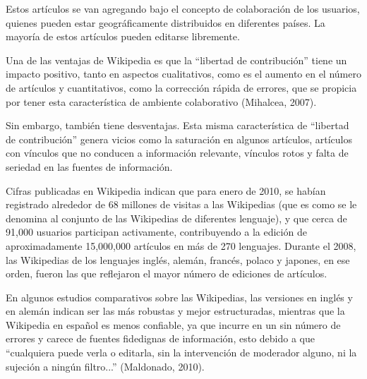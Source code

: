 \documentclass[letterpaper]{article}
\newcommand\textstylebibuscitbase[1]{#1}
\begin{document}
\bigskip

{\sffamily
Estos art\'iculos se van agregando bajo el concepto de colaboraci\'on de
los usuarios, quienes pueden estar geogr\'aficamente distribuidos en
diferentes pa\'ises. La mayor\'ia de estos art\'iculos pueden editarse
libremente.}


\bigskip

{\sffamily
Una de las ventajas de Wikipedia es que la {\textquotedblleft}libertad
de contribuci\'on{\textquotedblright} tiene un impacto positivo, tanto
en aspectos cualitativos, como es el aumento en el n\'umero de
art\'iculos y cuantitativos, como la correcci\'on r\'apida de errores,
que se propicia por tener esta caracter\'istica de ambiente
colaborativo \textstylebibuscitbase{(Mihalcea, 2007)}.}


\bigskip

{\sffamily
Sin embargo, tambi\'en tiene desventajas. Esta misma caracter\'istica de
{\textquotedblleft}libertad de contribuci\'on{\textquotedblright}
genera vicios como la saturaci\'on en algunos art\'iculos, art\'iculos
con v\'inculos que no conducen a informaci\'on relevante, v\'inculos
rotos y falta de seriedad en las fuentes de informaci\'on.}


\bigskip

{\sffamily
Cifras publicadas en Wikipedia indican que para enero de 2010, se
hab\'ian registrado alrededor de 68 millones de visitas a las
Wikipedias (que es como se le denomina al conjunto de las Wikipedias de
diferentes lenguaje), y que cerca de 91,000 usuarios participan
activamente, contribuyendo a la edici\'on de aproximadamente 15,000,000
art\'iculos en m\'as de 270 lenguajes. Durante el 2008, las Wikipedias
de los lenguajes ingl\'es, alem\'an, franc\'es, polaco y japones, en
ese orden, fueron las que reflejaron el mayor n\'umero de ediciones de
art\'iculos.}


\bigskip

{\sffamily
En algunos estudios comparativos sobre las Wikipedias, las versiones en
ingl\'es y en alem\'an indican ser las m\'as robustas y mejor
estructuradas, mientras que la Wikipedia en espa\~nol es menos
confiable, ya que incurre en un sin n\'umero de errores y carece de
fuentes fidedignas de informaci\'on, esto debido a que
{\textquotedblleft}cualquiera puede verla o editarla, sin la
intervenci\'on de moderador alguno, ni la sujeci\'on a ning\'un
filtro...{\textquotedblright} (Maldonado, 2010).}
\end{document}
